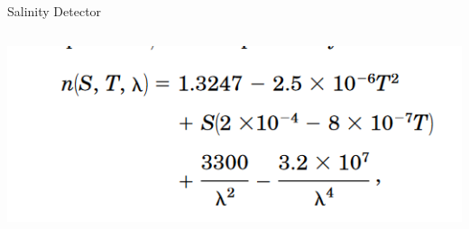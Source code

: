 \begin{frame}{Salinity Detector}
    \begin{columns}
        \begin{column}{\textwidth}
            \centering
            \includegraphics[width=\textwidth,keepaspectratio]{fs-images/image (5).png}
        \end{column}
    \end{columns}
\end{frame}